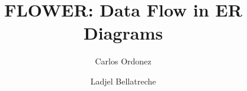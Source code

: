 \documentclass[sigconf,edbt]{acmart-edbt-workshops}
\newcommand{\+}{\discretionary{\mbox{${\bm\cdot}\mkern-1mu$}}{}{}}
\begin{document}
\title{FLOWER: Data Flow in ER Diagrams}

\begin{comment}
 \author{
\IEEEauthorblockN{Carlos Ordonez\IEEEauthorrefmark{1}, 
Ladjel Bellatreche\IEEEauthorrefmark{2} }

\IEEEauthorblockA{\IEEEauthorrefmark{1}University of Houston, USA.
\IEEEauthorrefmark{2}LIAS/ISAE-ENSMA, Poitiers, France.
} 
}
\end{comment}


\author{Carlos Ordonez}

\author{Ladjel Bellatreche}


\begin{comment}
\author{
\IEEEauthorblockN{Carlos Ordonez}           
\IEEEauthorblockA{University of Houston\\          
USA}                                               
\and                                               
\IEEEauthorblockN{Ladjel Bellatreche}               
\IEEEauthorblockA{LIAS/ISAE-ENSMA\\          
Poitiers, France}}                                              
\end{comment}




\end{document}
